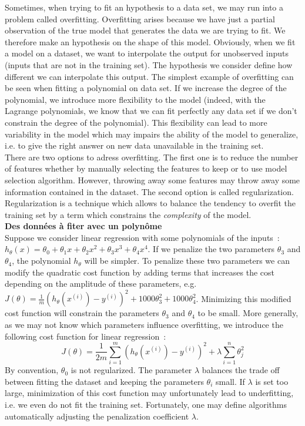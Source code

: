 \documentclass[10pt,a4paper]{article}
\begin{document}
Sometimes, when trying to fit an hypothesis to a data set, we may run
into a problem called overfitting. Overfitting arises because we have
just a partial observation of the true model that generates the data
we are trying to fit. We therefore make an hypothesis on the shape of
this model. Obviously, when we fit a model on a dataset, we want to
interpolate the output for unobserved inputs (inputs that are not in
the training set). The hypothesis we consider define how different we
can interpolate this output. The simplest example of overfitting can
be seen when fitting a polynomial on data set. If we increase the
degree of the polynomial, we introduce more flexibility to the model
(indeed, with the Lagrange polynomials, we know that we can fit
perfectly any data set if we don't constrain the degree of the
polynomial). This flexibility can lead to more variability in the
model which may impairs the ability of the model to generalize,
i.e. to give the right answer on new data unavailable in the training
set.\\

There are two options to adress overfitting. The first one is to
reduce the number of features whether by manually selecting the
features to keep or to use model selection algorithm. However,
throwing away some features may throw away some information contained
in the dataset. The second option is called
regularization. Regularization is a technique which allows to balance
the tendency to overfit the training set by a term which constrains
the \emph{complexity} of the model.\\

\textbf{Des données à fiter avec un polynôme}\\

Suppose we consider linear regression with some polynomials of the
inputs~:$h_\theta(x) = \theta_0 + \theta_1 x + \theta_2 x^2 + \theta_3
x^3 + \theta_4 x^4$. If we penalize the two parameters $\theta_3$ and
$\theta_4$, the polynomial $h_\theta$ will be simpler. To penalize
these two parameters we can modify the quadratic cost function by
adding terms that increases the cost depending on the amplitude of
these parameters, e.g. $J(\theta) = \frac{1}{m} (h_\theta(x^{(i)}) -
y^{(i)})^2 + 1000 \theta_3^2 + 1000 \theta_4^2$. Minimizing this
modified cost function will constrain the parameters $\theta_3$ and
$\theta_4$ to be small. More generally, as we may not know which
parameters influence overfitting, we introduce the following cost
function for linear regression~:
\begin{equation}
J(\theta) = \frac{1}{2m} \sum_{i=1}^m (h_\theta(x^{(i)}) -
y^{(i)})^2 + \lambda \sum_{i=1}^{n} \theta_j^2
\end{equation}
By convention, $\theta_0$ is not regularized. The parameter $\lambda$
balances the trade off between fitting the dataset and keeping the
parameters $\theta_i$ small. If $\lambda$ is set too large,
minimization of this cost function may unfortunately lead to
underfitting, i.e. we even do not fit the training set. Fortunately,
one may define algorithms automatically adjusting the penalization
coefficient $\lambda$.\\
\end{document}
